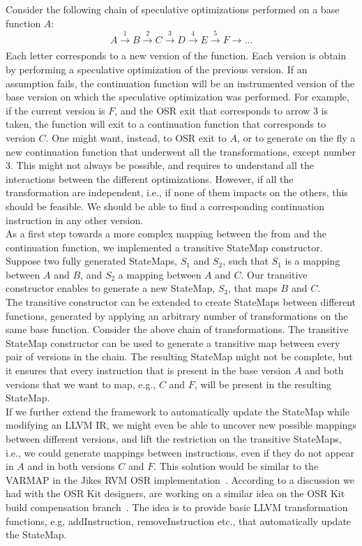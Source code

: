 Consider the following chain of speculative optimizations performed on a base function $A$: 
$$A \xrightarrow[]{1} B \xrightarrow[]{2} C \xrightarrow[]{3} D \xrightarrow[]{4} E \xrightarrow[]{5} F \rightarrow ...$$
Each letter corresponds to a new version of the function. 
Each version is obtain by performing a speculative optimization of the previous version.
If an assumption fails, the continuation function will be an instrumented version of the base version on which the speculative optimization was performed.
For example, if the current version is $F$, and the OSR exit that corresponds to arrow 3 is taken, 
the function will exit to a continuation function that corresponds to version $C$.
One might want, instead, to OSR exit to $A$, or to generate on the fly a new continuation function that underwent all the transformations, except number 3. 
This might not always be possible, and requires to understand all the interactions between the different optimizations.
However, if all the transformation are independent, i.e., if none of them impacts on the others, this should be feasible.
We should be able to find a corresponding continuation instruction in any other version.\\

As a first step towards a more complex mapping between the from and the continuation function, we implemented a transitive StateMap constructor.
Suppose two fully generated StateMaps, $S_1$ and $S_2$, such that $S_1$ is a mapping between $A$ and $B$, and $S_2$ a mapping between $A$ and $C$.
Our transitive constructor enables to generate a new StateMap, $S_3$, that maps $B$ and $C$.\\

The transitive constructor can be extended to create StateMaps between different functions, generated by applying an arbitrary number of transformations on the same base function.
Consider the above chain of transformations.
The transitive StateMap constructor can be used to generate a transitive map between every pair of versions in the chain.
The resulting StateMap might not be complete, but it ensures that every instruction that is present in the base version $A$ and both versions that we want to map, e.g., $C$ and $F$, will be present in the resulting StateMap.\\

If we further extend the framework to automatically update the StateMap while modifying an LLVM IR, we might even be able to uncover new possible mappings between different versions, and lift the restriction on the transitive StateMaps, i.e., we could generate mappings between instructions, even if they do not appear in $A$ and in both versions $C$ and $F$.
This solution would be similar to the VARMAP in the Jikes RVM OSR implementation~\cite{soman2006efficient}.
According to a discussion we had with the OSR Kit designers,  are working on a similar idea on the OSR Kit build compensation branch~\cite{OSRKitGit}.
The idea is to provide basic LLVM transformation functions, e.g, addInstruction, removeInstruction etc., that automatically update the StateMap.\\

